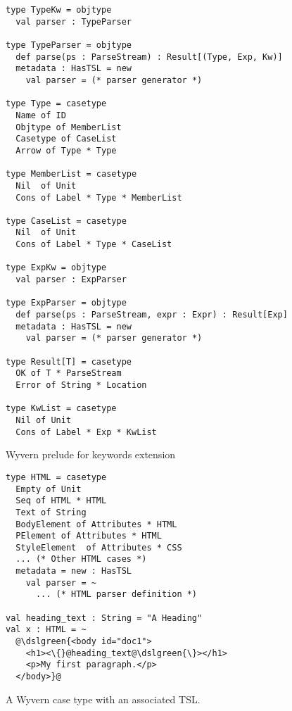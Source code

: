 \documentclass{sig-alternate}
\newcommand{\dslgreen}[1]{\textcolor[HTML]{339933}{#1}}
\begin{document}
\begin{figure}[ht!]
\begin{lstlisting}[style=wyvern]
type TypeKw = objtype
  val parser : TypeParser

type TypeParser = objtype
  def parse(ps : ParseStream) : Result[(Type, Exp, Kw)]
  metadata : HasTSL = new 
    val parser = (* parser generator *)

type Type = casetype
  Name of ID
  Objtype of MemberList
  Casetype of CaseList
  Arrow of Type * Type

type MemberList = casetype
  Nil  of Unit
  Cons of Label * Type * MemberList

type CaseList = casetype
  Nil  of Unit
  Cons of Label * Type * CaseList

type ExpKw = objtype
  val parser : ExpParser

type ExpParser = objtype
  def parse(ps : ParseStream, expr : Expr) : Result[Exp]
  metadata : HasTSL = new 
    val parser = (* parser generator *)

type Result[T] = casetype
  OK of T * ParseStream
  Error of String * Location

type KwList = casetype
  Nil of Unit
  Cons of Label * Exp * KwList
\end{lstlisting}
\vspace{-8px}
\caption{Wyvern prelude for keywords extension}
\vspace{-10px}
\end{figure}

\begin{figure}[ht!]
\begin{lstlisting}[style=wyvern]
type HTML = casetype 
  Empty of Unit
  Seq of HTML * HTML 
  Text of String
  BodyElement of Attributes * HTML
  PElement of Attributes * HTML
  StyleElement  of Attributes * CSS
  ... (* Other HTML cases *)
  metadata = new : HasTSL
    val parser = ~
      ... (* HTML parser definition *)

val heading_text : String = "A Heading"
val x : HTML = ~
  @\dslgreen{<body id="doc1">
    <h1><\{}@heading_text@\dslgreen{\}></h1>
    <p>My first paragraph.</p>
  </body>}@
\end{lstlisting}
\vspace{-8px}
\caption{A Wyvern case type with an associated TSL. }
\vspace{-10px}
\label{f-htmltype}
\end{figure}
\end{document}
